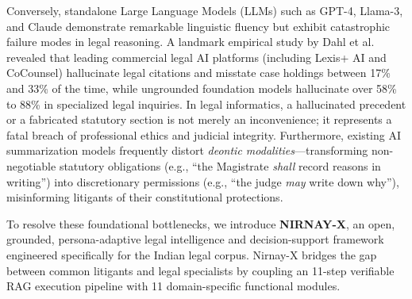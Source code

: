 \documentclass[conference]{IEEEtran}
\begin{document}
Conversely, standalone Large Language Models (LLMs) such as GPT-4, Llama-3, and Claude demonstrate remarkable linguistic fluency but exhibit catastrophic failure modes in legal reasoning. A landmark empirical study by Dahl et al.~\cite{dahl2024large} revealed that leading commercial legal AI platforms (including Lexis+ AI and CoCounsel) hallucinate legal citations and misstate case holdings between 17\% and 33\% of the time, while ungrounded foundation models hallucinate over 58\% to 88\% in specialized legal inquiries. In legal informatics, a hallucinated precedent or a fabricated statutory section is not merely an inconvenience; it represents a fatal breach of professional ethics and judicial integrity. Furthermore, existing AI summarization models frequently distort \textit{deontic modalities}—transforming non-negotiable statutory obligations (e.g., ``the Magistrate \textit{shall} record reasons in writing'') into discretionary permissions (e.g., ``the judge \textit{may} write down why''), misinforming litigants of their constitutional protections.

To resolve these foundational bottlenecks, we introduce \textbf{NIRNAY-X}, an open, grounded, persona-adaptive legal intelligence and decision-support framework engineered specifically for the Indian legal corpus. Nirnay-X bridges the gap between common litigants and legal specialists by coupling an 11-step verifiable RAG execution pipeline with 11 domain-specific functional modules.
\end{document}
